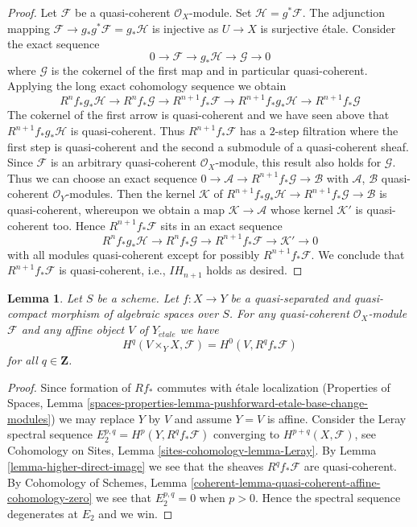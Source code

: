 \documentclass{stacks-project}
\theoremstyle{plain}
\newtheorem{lemma}[subsection]{Lemma}
\theoremstyle{definition}
\theoremstyle{remark}
\numberwithin{equation}{subsection}
\def\etale{{\acute{e}tale}}
\begin{document}
\begin{proof}
\medskip\noindent
Let $\mathcal{F}$ be a quasi-coherent $\mathcal{O}_X$-module.
Set $\mathcal{H} = g^*\mathcal{F}$. The adjunction mapping
$\mathcal{F} \to g_*g^*\mathcal{F} = g_*\mathcal{H}$ is injective
as $U \to X$ is surjective \'etale. Consider the exact sequence
$$
0 \to \mathcal{F} \to g_*\mathcal{H} \to \mathcal{G} \to 0
$$
where $\mathcal{G}$ is the cokernel of the first map and in particular
quasi-coherent. Applying the long exact cohomology sequence we obtain
$$
R^nf_*g_*\mathcal{H} \to
R^nf_*\mathcal{G} \to
R^{n + 1}f_*\mathcal{F} \to
R^{n + 1}f_*g_*\mathcal{H} \to
R^{n + 1}f_*\mathcal{G}
$$
The cokernel of the first arrow is quasi-coherent and
we have seen above that $R^{n + 1}f_*g_*\mathcal{H}$ is quasi-coherent.
Thus $R^{n + 1}f_*\mathcal{F}$ has a $2$-step filtration
where the first step is quasi-coherent and the second a submodule of
a quasi-coherent sheaf. Since $\mathcal{F}$ is an arbitrary quasi-coherent
$\mathcal{O}_X$-module, this result also holds for $\mathcal{G}$.
Thus we can choose an exact sequence
$0 \to \mathcal{A} \to R^{n + 1}f_*\mathcal{G} \to \mathcal{B}$
with $\mathcal{A}$, $\mathcal{B}$ quasi-coherent $\mathcal{O}_Y$-modules.
Then the kernel $\mathcal{K}$ of
$R^{n + 1}f_*g_*\mathcal{H} \to R^{n + 1}f_*\mathcal{G}
\to \mathcal{B}$ is quasi-coherent, whereupon we obtain a map
$\mathcal{K} \to \mathcal{A}$ whose kernel $\mathcal{K}'$ is
quasi-coherent too. Hence $R^{n + 1}f_*\mathcal{F}$ sits in an exact
sequence
$$
R^nf_*g_*\mathcal{H} \to
R^nf_*\mathcal{G} \to
R^{n + 1}f_*\mathcal{F} \to \mathcal{K}' \to 0
$$
with all modules quasi-coherent except for possibly $R^{n + 1}f_*\mathcal{F}$.
We conclude that $R^{n + 1}f_*\mathcal{F}$ is quasi-coherent, i.e.,
$IH_{n + 1}$ holds as desired.
\end{proof}

\begin{lemma}
\label{lemma-quasi-coherence-higher-direct-images-application}
Let $S$ be a scheme. Let $f : X \to Y$ be a quasi-separated and quasi-compact
morphism of algebraic spaces over $S$. For any quasi-coherent
$\mathcal{O}_X$-module $\mathcal{F}$ and any affine object $V$ of
$Y_\etale$ we have
$$
H^q(V \times_Y X, \mathcal{F}) = H^0(V, R^qf_*\mathcal{F})
$$
for all $q \in \mathbf{Z}$.
\end{lemma}

\begin{proof}
Since formation of $Rf_*$ commutes with \'etale localization
(Properties of Spaces, Lemma
\ref{spaces-properties-lemma-pushforward-etale-base-change-modules})
we may replace $Y$ by $V$ and assume $Y = V$ is affine.
Consider the Leray spectral sequence
$E_2^{p, q} = H^p(Y, R^qf_*\mathcal{F})$
converging to $H^{p + q}(X, \mathcal{F})$, see
Cohomology on Sites, Lemma \ref{sites-cohomology-lemma-Leray}.
By Lemma \ref{lemma-higher-direct-image}
we see that the sheaves $R^qf_*\mathcal{F}$ are quasi-coherent. By
Cohomology of Schemes, Lemma
\ref{coherent-lemma-quasi-coherent-affine-cohomology-zero}
we see that $E_2^{p, q} = 0$ when $p > 0$.
Hence the spectral sequence degenerates at $E_2$ and we win.
\end{proof}
\end{document}

